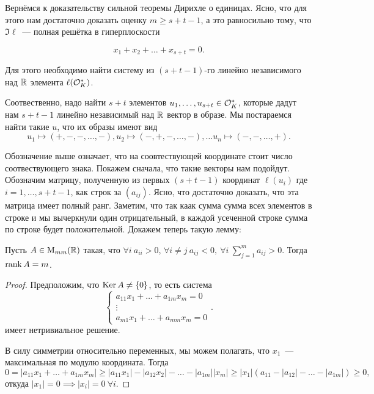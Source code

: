 
	Вернёмся к доказательству сильной теоремы Дирихле о единицах. Ясно, что для этого нам достаточно доказать оценку $m \ge s + t - 1$, а это равносильно тому, что $\Im{\ell}$~--- полная решётка в гиперплоскости 

	\[
			x_1 + x_2 + \ldots + x_{s + t} = 0.
	\]

	Для этого необходимо найти систему из $(s + t - 1)$-го линейно независимого над $\mathbb{R}$ элемента $\ell\lr*{\cO_{K}^{*}}$. 

	Соотвественно, надо найти $s + t$ элементов $u_{1}, \ldots, u_{s + t} \in \mathcal{O}_{K}^{*}$, которые дадут нам $s + t - 1$ линейно независимый над $\mathbb{R}$ вектор в образе. Мы постараемся найти такие $u$, что их образы имеют вид 
	\[
		u_1 \mapsto (+, -, - , \ldots, -), u_2 \mapsto (-, +, -, \ldots, -), \ldots u_n \mapsto (-, -, \ldots, +).
	\]

	Обозначение выше означает, что на соовтествующей координате стоит число соотвествующего знака. Покажем сначала, что такие векторы нам подойдут. Обозначим матрицу, полученную из первых $(s + t - 1)$ координат $\ell(u_i)$ где $i = 1, \ldots, s + t - 1$, как строк за $(a_{i j})$. Ясно, что достаточно доказать, что эта матрица имеет полный ранг. Заметим, что так каак сумма сумма всех элементов в строке и мы вычеркнули один отрицательный, в каждой усеченной строке сумма по строке будет положительной.  Докажем теперь такую лемму: 

	\begin{lemma} 
		Пусть $A \in \mathrm{M}_{m m}(\mathbb{R})$ такая, что $\forall i  \ a_{ii} > 0$, $\forall i \neq j \ a_{i j } < 0, \ \forall i \ \sum_{j = 1}^{m} a_{i j} > 0$. Тогда $\operatorname{rank}{A} = m$. 
	\end{lemma}

	\begin{proof}
		 Предположим, что $\operatorname{Ker}{A} \neq \{ 0 \}$, то есть система
		 \[
		 	\begin{cases} a_{11} x_1 + \ldots + a_{1 m } x_m = 0 \\ \vdots \\ a_{m 1} x_1 + \ldots + a_{m m} x_m = 0 \end{cases}.
		 \]
		 имеет нетривиальное решение. 

		 В силу симметрии относительно переменных, мы можем полагать, что $x_1$~--- максимальная по модулю координата. Тогда 
		 \[
		 	 0 = |a_{11} x_1 + \ldots + a_{1m} x_m| \ge |a_{11} x_{1}| - |a_{1 2} x_2| - \ldots - |a_{1 m}||x_m| \ge |x_1|(a_{1 1} - |a_{1 2} | - \ldots - |a_{1 m }|) \ge 0,
		 \]
		 откуда $|x_1| = 0 \implies |x_i| = 0 \ \forall i$.
	\end{proof}

